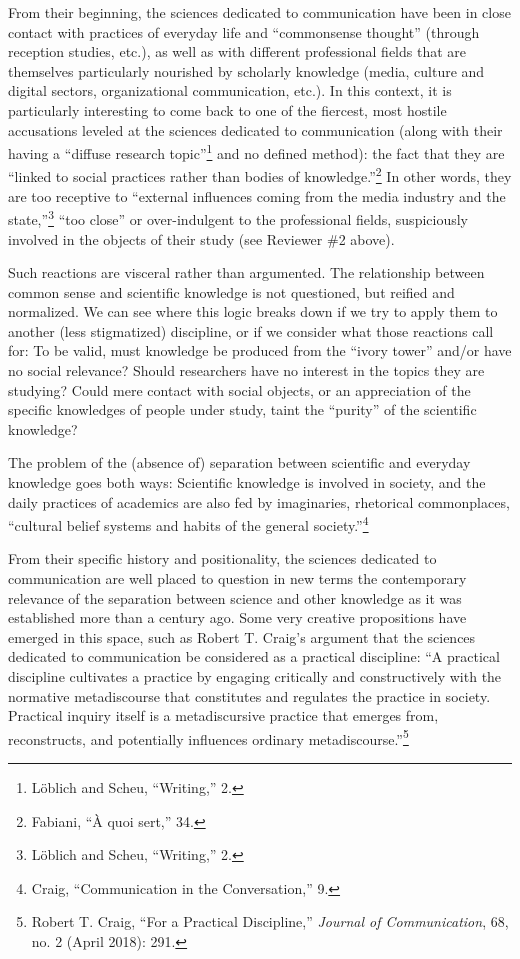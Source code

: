 \documentclass{tufte-handout}
\begin{document}
From their beginning, the sciences dedicated to communication have been
in close contact with practices of everyday life and ``commonsense
thought'' (through reception studies, etc.), as well as with different
professional fields that are themselves particularly nourished by
scholarly knowledge (media, culture and digital sectors, organizational
communication, etc.). In this context, it is particularly interesting to
come back to one of the fiercest, most hostile accusations leveled at
the sciences dedicated to communication (along with their having a
``diffuse research topic''\footnote{Löblich and Scheu, ``Writing,'' 2.}
and no defined method): the fact that they are ``linked to social
practices rather than bodies of knowledge.''\footnote{Fabiani, ``À quoi
  sert,'' 34.} In other words, they are too receptive to ``external
influences coming from the media industry and the state,''\footnote{Löblich
  and Scheu, ``Writing,'' 2.} ``too close'' or over-indulgent to the
professional fields, suspiciously involved in the objects of their study
(see Reviewer \#2 above).

Such reactions are visceral rather than argumented. The relationship
between common sense and scientific knowledge is not questioned, but
reified and normalized. We can see where this logic breaks down if we
try to apply them to another (less stigmatized) discipline, or if we
consider what those reactions call for: To be valid, must knowledge be
produced from the ``ivory tower'' and/or have no social relevance?
Should researchers have no interest in the topics they are studying?
Could mere contact with social objects, or an appreciation of the
specific knowledges of people under study, taint the ``purity'' of the
scientific knowledge?

The problem of the (absence of) separation between scientific and
everyday knowledge goes both ways: Scientific knowledge is involved in
society, and the daily practices of academics are also fed by
imaginaries, rhetorical commonplaces, ``cultural belief systems and
habits of the general society.''\footnote{Craig, ``Communication in the
  Conversation,'' 9.}

From their specific history and positionality, the sciences dedicated to
communication are well placed to question in new terms the contemporary
relevance of the separation between science and other knowledge as it
was established more than a century ago. Some very creative propositions
have emerged in this space, such as Robert T. Craig's argument that the
sciences dedicated to communication be considered as a practical
discipline: ``A practical discipline cultivates a practice by engaging
critically and constructively with the normative metadiscourse that
constitutes and regulates the practice in society. Practical inquiry
itself is a metadiscursive practice that emerges from, reconstructs, and
potentially influences ordinary metadiscourse.''\footnote{Robert T.
  Craig, ``For a Practical Discipline,'' \emph{Journal of
  Communication}, 68, no. 2 (April 2018): 291.}
\end{document}
